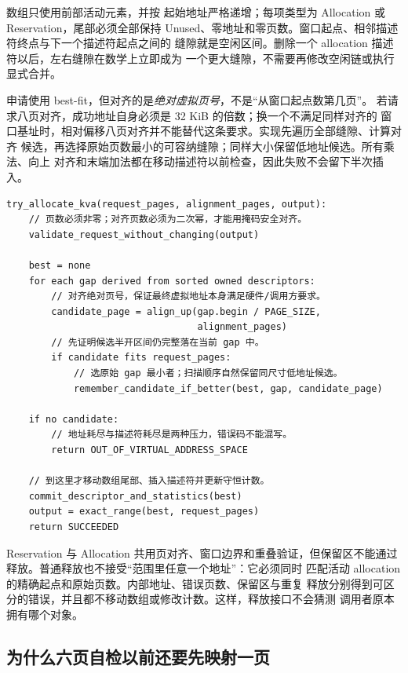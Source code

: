  数组只使用前部活动元素，并按
起始地址严格递增；每项类型为 Allocation 或 Reservation，尾部必须全部保持
Unused、零地址和零页数。窗口起点、相邻描述符终点与下一个描述符起点之间的
缝隙就是空闲区间。删除一个 allocation 描述符以后，左右缝隙在数学上立即成为
一个更大缝隙，不需要再修改空闲链或执行显式合并。

申请使用 best-fit，但对齐的是\emph{绝对虚拟页号}，不是“从窗口起点数第几页”。
若请求八页对齐，成功地址自身必须是 32 KiB 的倍数；换一个不满足同样对齐的
窗口基址时，相对偏移八页对齐并不能替代这条要求。实现先遍历全部缝隙、计算对齐
候选，再选择原始页数最小的可容纳缝隙；同样大小保留低地址候选。所有乘法、向上
对齐和末端加法都在移动描述符以前检查，因此失败不会留下半次插入。

\begin{lstlisting}
try_allocate_kva(request_pages, alignment_pages, output):
    // 页数必须非零；对齐页数必须为二次幂，才能用掩码安全对齐。
    validate_request_without_changing(output)

    best = none
    for each gap derived from sorted owned descriptors:
        // 对齐绝对页号，保证最终虚拟地址本身满足硬件/调用方要求。
        candidate_page = align_up(gap.begin / PAGE_SIZE,
                                  alignment_pages)
        // 先证明候选半开区间仍完整落在当前 gap 中。
        if candidate fits request_pages:
            // 选原始 gap 最小者；扫描顺序自然保留同尺寸低地址候选。
            remember_candidate_if_better(best, gap, candidate_page)

    if no candidate:
        // 地址耗尽与描述符耗尽是两种压力，错误码不能混写。
        return OUT_OF_VIRTUAL_ADDRESS_SPACE

    // 到这里才移动数组尾部、插入描述符并更新守恒计数。
    commit_descriptor_and_statistics(best)
    output = exact_range(best, request_pages)
    return SUCCEEDED
\end{lstlisting}

Reservation 与 Allocation 共用页对齐、窗口边界和重叠验证，但保留区不能通过
 释放。普通释放也不接受“范围里任意一个地址”：它必须同时
匹配活动 allocation 的精确起点和原始页数。内部地址、错误页数、保留区与重复
释放分别得到可区分的错误，并且都不移动数组或修改计数。这样，释放接口不会猜测
调用者原本拥有哪个对象。

\subsection{为什么六页自检以前还要先映射一页}

